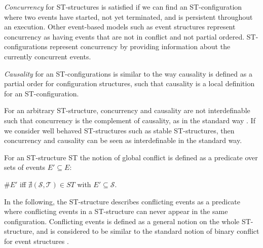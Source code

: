     \emph{Concurrency} for ST-structures is satisfied if we can find an ST-configuration where two events have started, not yet terminated, and is persistent throughout an execution. Other event-based models such as event structures represent concurrency as having events that are not in conflict and not partial ordered. ST-configurations represent concurrency by providing information about the currently concurrent events. 
    
    
    \emph{Causality} for an ST-configurations is similar to the way causality is defined as a partial order for configuration structures, such that  causality is a local definition for an ST-configuration.
    
    For an arbitrary ST-structure, concurrency and causality are not interdefinable such that concurrency is the complement of causality, as in the standard way \cite[Definition 5.6]{GlabbeekG01refinement}. If we consider well behaved ST-structures such as stable ST-structures, then concurrency and causality can be seen as interdefinable in the standard way.
    
    \begin{definition}
        \label{def:ST-structure conflict}
        For an ST-structure ST the notion of global conflict is defined as a predicate over sets of events $E' \subseteq E$:
        
        \begin{center}
            $\# E'$ iff $\nexists (\mathcal{S},\mathcal{T}) \in ST$ with $E' \subseteq \mathcal{S}$.
        \end{center}
    \end{definition}
    
    In the following, the ST-structure describes conflicting events as a predicate where conflicting events in a ST-structure can never appear in the same configuration. Conflicting events is defined as a general notion on the whole ST-structure, and is considered to be similar to the standard notion of binary conflict for event structures \cite{winskel95modelsCategory}.

